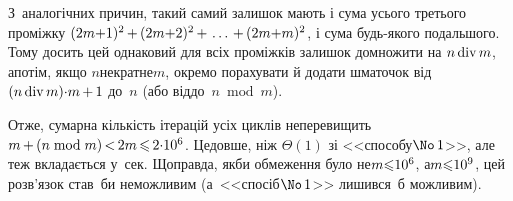 З~аналогічних причин, такий самий залишок %
мають і сума усього третього проміжку $(2m{+}1)^2\dib{{+}}(2m{+}2)^2\dib{{+}}\dots\dib{{+}}(2m{+}m)^2$, і сума будь-якого подальшого. Тому досить цей однаковий для всіх проміжків залишок домножити на ${n\mathop{\rm div}\nolimits m}$, а\nolinebreak[3] потім, якщо %
$n$\nolinebreak[2] не\nolinebreak[3] кратне\nolinebreak[3] $m$, окремо порахувати й додати шматочок від ${(n\bdiv m){\cdot}m}\dib{{+}}1$ до~$n$ (або від\nolinebreak[2] до~$n\bmod m$). 

Отже, сумарна кількість ітерацій усіх циклів не\nolinebreak[3] перевищить $m\dib{{+}}(n\bmod m)\dib{{<}}2m\dib{{\<}}{2{\cdot}10^6}$. Це\nolinebreak[3] довше, ніж $\Theta(1)$ зі <<способу\nolinebreak[3] $\No\,1$>>, але теж вкладається у~сек. Щоправда, якби обмеження було не\nolinebreak[3] ${m{\leqslant}10^6}$, а\nolinebreak[2] ${m{\leqslant}10^9}$, цей розв'язок став~би неможливим (а~<<спосіб\nolinebreak[3] $\No\,1$>> лишився~б можливим).


